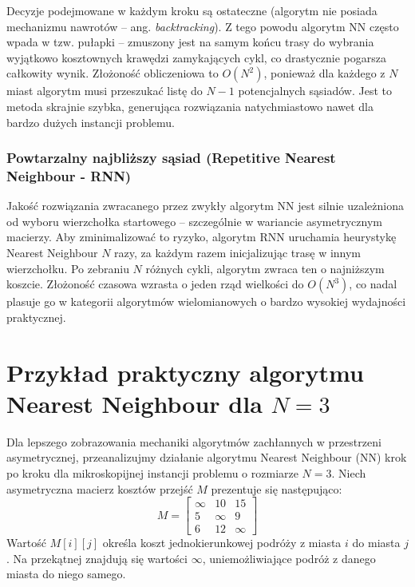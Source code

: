 \documentclass[12pt, a4paper]{article}
\begin{document}
	Decyzje podejmowane w każdym kroku są ostateczne (algorytm nie posiada mechanizmu nawrotów – ang. \textit{backtracking}). Z tego powodu algorytm NN często wpada w tzw. pułapki – zmuszony jest na samym końcu trasy do wybrania wyjątkowo kosztownych krawędzi zamykających cykl, co drastycznie pogarsza całkowity wynik.
	Złożoność obliczeniowa to $O(N^2)$, ponieważ dla każdego z $N$ miast algorytm musi przeszukać listę do $N-1$ potencjalnych sąsiadów. Jest to metoda skrajnie szybka, generująca rozwiązania natychmiastowo nawet dla bardzo dużych instancji problemu.
	
	\subsubsection{Powtarzalny najbliższy sąsiad (Repetitive Nearest Neighbour - RNN)}
	Jakość rozwiązania zwracanego przez zwykły algorytm NN jest silnie uzależniona od wyboru wierzchołka startowego – szczególnie w wariancie asymetrycznym macierzy. Aby zminimalizować to ryzyko, algorytm RNN uruchamia heurystykę Nearest Neighbour $N$ razy, za każdym razem inicjalizując trasę w innym wierzchołku. Po zebraniu $N$ różnych cykli, algorytm zwraca ten o najniższym koszcie. Złożoność czasowa wzrasta o jeden rząd wielkości do $O(N^3)$, co nadal plasuje go w kategorii algorytmów wielomianowych o bardzo wysokiej wydajności praktycznej.
	
	
	\section{Przykład praktyczny algorytmu Nearest Neighbour dla $N=3$}
	
	Dla lepszego zobrazowania mechaniki algorytmów zachłannych w przestrzeni asymetrycznej, przeanalizujmy działanie algorytmu Nearest Neighbour (NN) krok po kroku dla mikroskopijnej instancji problemu o rozmiarze $N=3$. Niech asymetryczna macierz kosztów przejść $M$ prezentuje się następująco:
	$$ M = \begin{bmatrix} \infty & 10 & 15 \\ 5 & \infty & 9 \\ 6 & 12 & \infty \end{bmatrix} $$
	Wartość $M[i][j]$ określa koszt jednokierunkowej podróży z miasta $i$ do miasta $j$. Na przekątnej znajdują się wartości $\infty$, uniemożliwiające podróż z danego miasta do niego samego.
	
\end{document}
